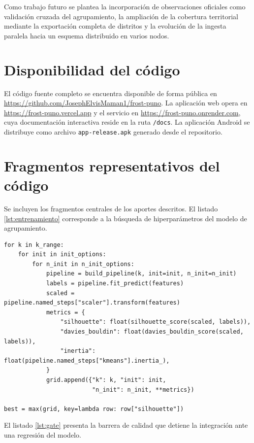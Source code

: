 \documentclass[conference]{IEEEtran}
\begin{document}
Como trabajo futuro se plantea la incorporaci\'on de observaciones oficiales
como validaci\'on cruzada del agrupamiento, la ampliaci\'on de la cobertura
territorial mediante la exportaci\'on completa de distritos y la evoluci\'on de
la ingesta paralela hacia un esquema distribuido en varios nodos.

\section*{Disponibilidad del c\'odigo}

El c\'odigo fuente completo se encuentra disponible de forma p\'ublica en
\url{https://github.com/JosephElvisMaman1/frost-puno}. La aplicaci\'on web
opera en \url{https://frost-puno.vercel.app} y el servicio en
\url{https://frost-puno.onrender.com}, cuya documentaci\'on interactiva reside
en la ruta \texttt{/docs}. La aplicaci\'on Android se distribuye como archivo
\texttt{app-release.apk} generado desde el repositorio.

\appendices

\section{Fragmentos representativos del c\'odigo}

Se incluyen los fragmentos centrales de los aportes descritos. El listado
\ref{lst:entrenamiento} corresponde a la b\'usqueda de hiperpar\'ametros del
modelo de agrupamiento.

\begin{lstlisting}[caption={B\'usqueda exhaustiva de hiperpar\'ametros},label={lst:entrenamiento}]
for k in k_range:
    for init in init_options:
        for n_init in n_init_options:
            pipeline = build_pipeline(k, init=init, n_init=n_init)
            labels = pipeline.fit_predict(features)
            scaled = pipeline.named_steps["scaler"].transform(features)
            metrics = {
                "silhouette": float(silhouette_score(scaled, labels)),
                "davies_bouldin": float(davies_bouldin_score(scaled, labels)),
                "inertia": float(pipeline.named_steps["kmeans"].inertia_),
            }
            grid.append({"k": k, "init": init,
                         "n_init": n_init, **metrics})

best = max(grid, key=lambda row: row["silhouette"])
\end{lstlisting}

El listado \ref{lst:gate} presenta la barrera de calidad que detiene la
integraci\'on ante una regresi\'on del modelo.
\end{document}
